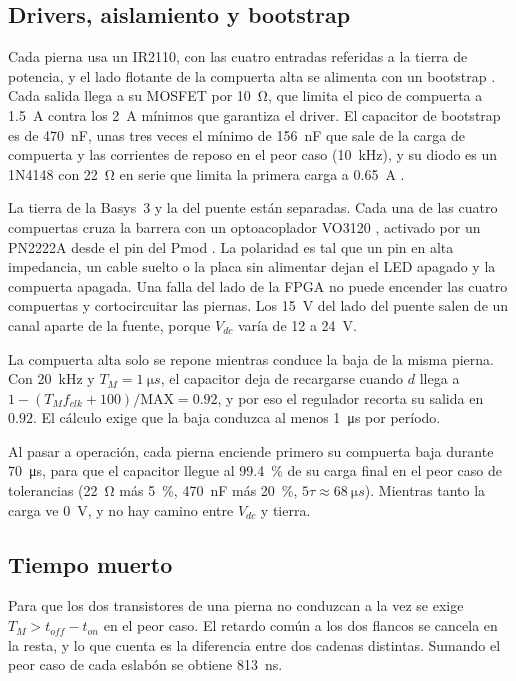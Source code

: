 \documentclass[journal]{IEEEtran}
\begin{document}
\subsection{Drivers, aislamiento y bootstrap}
\label{sec:drivers}
Cada pierna usa un IR2110, con las cuatro entradas referidas a la tierra de potencia, y el lado flotante de la compuerta alta se alimenta con un bootstrap \cite{ir2110}. Cada salida llega a su MOSFET por \SI{10}{\ohm}, que limita el pico de compuerta a \SI{1.5}{A} contra los \SI{2}{A} mínimos que garantiza el driver. El capacitor de bootstrap es de \SI{470}{nF}, unas tres veces el mínimo de \SI{156}{nF} que sale de la carga de compuerta y las corrientes de reposo en el peor caso (\SI{10}{kHz}), y su diodo es un 1N4148 con \SI{22}{\ohm} en serie que limita la primera carga a \SI{0.65}{A} \cite{1n4148}.

La tierra de la Basys~3 y la del puente están separadas. Cada una de las cuatro compuertas cruza la barrera con un optoacoplador VO3120 \cite{vo3120}, activado por un PN2222A desde el pin del Pmod \cite{pn2222a}. La polaridad es tal que un pin en alta impedancia, un cable suelto o la placa sin alimentar dejan el LED apagado y la compuerta apagada. Una falla del lado de la FPGA no puede encender las cuatro compuertas y cortocircuitar las piernas. Los \SI{15}{V} del lado del puente salen de un canal aparte de la fuente, porque $V_{dc}$ varía de \num{12} a \SI{24}{V}.

La compuerta alta solo se repone mientras conduce la baja de la misma pierna. Con \SI{20}{kHz} y $T_M=\SI{1}{\micro s}$, el capacitor deja de recargarse cuando $d$ llega a $1-(T_M f_{clk}+100)/\mathrm{MAX}=\num{0.92}$, y por eso el regulador recorta su salida en $0.92$. El cálculo exige que la baja conduzca al menos \SI{1}{\micro s} por período.

Al pasar a operación, cada pierna enciende primero su compuerta baja durante \SI{70}{\micro s}, para que el capacitor llegue al \SI{99.4}{\percent} de su carga final en el peor caso de tolerancias (\SI{22}{\ohm} más \SI{5}{\percent}, \SI{470}{nF} más \SI{20}{\percent}, $5\tau\approx\SI{68}{\micro s}$). Mientras tanto la carga ve \SI{0}{V}, y no hay camino entre $V_{dc}$ y tierra.

\subsection{Tiempo muerto}
\label{sec:tm}
Para que los dos transistores de una pierna no conduzcan a la vez se exige $T_M>t_{off}-t_{on}$ en el peor caso. El retardo común a los dos flancos se cancela en la resta, y lo que cuenta es la diferencia entre dos cadenas distintas. Sumando el peor caso de cada eslabón se obtiene \SI{813}{ns}.
\end{document}
